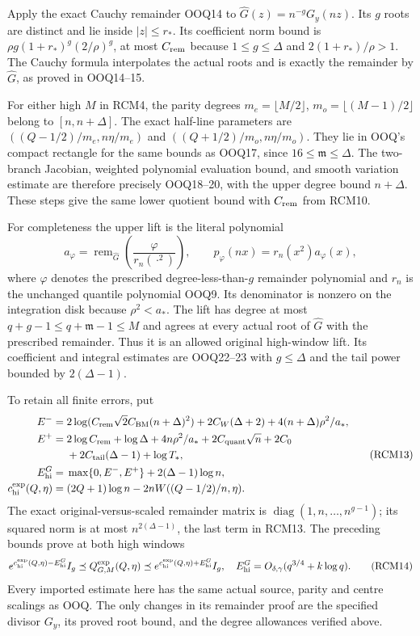 \documentclass[11pt,a4paper]{article}
\begin{document}
Apply the exact Cauchy remainder OOQ14 to
$\widehat G(z)=n^{-g}G_y(nz)$. Its $g$ roots are distinct
and lie inside $|z|\le r_*$. Its coefficient norm bound is
$\rho g(1+r_*)^g(2/\rho)^g$, at most $C_{\rm rem}$ because
$1\le g\le\Delta$ and $2(1+r_*)/\rho>1$. The Cauchy
formula interpolates the actual roots and is exactly the
remainder by $\widehat G$, as proved in OOQ14--15.

For either high $M$ in RCM4, the parity degrees
$m_e=\lfloor M/2\rfloor$, $m_o=\lfloor(M-1)/2\rfloor$
belong to $[n,n+\Delta]$. The exact half-line parameters are
$((Q-1/2)/m_e,n\eta/m_e)$ and
$((Q+1/2)/m_o,n\eta/m_o)$. They lie in OOQ's compact
rectangle for the same bounds as OOQ17, since
$16\le\mathfrak m\le\Delta$. The two-branch Jacobian,
weighted polynomial evaluation bound, and smooth variation
estimate are therefore precisely OOQ18--20, with the upper
degree bound $n+\Delta$. These steps give the same lower
quotient bound with $C_{\rm rem}$ from RCM10.

For completeness the upper lift is the literal polynomial
\[
 a_{\varphi}=\operatorname{rem}_{\widehat G}
                   \left(\frac{\varphi}{r_n(\cdot^2)}\right),
 \qquad p_{\varphi}(nx)=r_n(x^2)a_{\varphi}(x),
 \tag{RCM12}
\]
where $\varphi$ denotes the prescribed
degree-less-than-$g$ remainder polynomial and $r_n$ is the
unchanged quantile polynomial OOQ9. Its denominator is nonzero
on the integration disk because $\rho^2<a_*$. The lift has
degree at most $q+g-1\le q+\mathfrak m-1\le M$ and agrees
at every actual root of $\widehat G$ with the prescribed
remainder. Thus it is an allowed original high-window lift.
Its coefficient and integral estimates are OOQ22--23 with
$g\le\Delta$ and the tail power bounded by $2(\Delta-1)$.

To retain all finite errors, put
\[
 \begin{split}
 E^-={}&2\log(C_{\rm rem}\sqrt2 C_{\rm BM}(n+\Delta)^2)
           +2C_W(\Delta+2)+4(n+\Delta)\rho^2/a_*,\\
 E^+={}&2\log C_{\rm rem}+\log\Delta+4n\rho^2/a_*
       +2C_{\rm quant}\sqrt n+2C_0\\
       &{}+2C_{\rm tail}(\Delta-1)+\log T_*,\\
 E_{\rm hi}^G={}&\max\{0,E^-,E^+\}+2(\Delta-1)\log n,\\
 c_{\rm hi}^{\exp}(Q,\eta)
       ={}&(2Q+1)\log n-2nW((Q-1/2)/n,\eta).
 \end{split}\tag{RCM13}
\]
The exact original-versus-scaled remainder matrix is
$\operatorname{diag}(1,n,\ldots,n^{g-1})$; its squared
norm is at most $n^{2(\Delta-1)}$, the last term in RCM13.
The preceding bounds prove at both high windows
\[
 e^{c_{\rm hi}^{\exp}(Q,\eta)-E_{\rm hi}^G}I_g
 \preceq Q_{G,M}^{\exp}(Q,\eta)
 \preceq e^{c_{\rm hi}^{\exp}(Q,\eta)+E_{\rm hi}^G}I_g,
 \quad E_{\rm hi}^G=O_{\delta,\gamma}(q^{3/4}+k\log q).
 \tag{RCM14}
\]
Every imported estimate here has the same actual source,
parity and centre scalings as OOQ. The only changes in its
remainder proof are the specified divisor $G_y$, its proved
root bound, and the degree allowances verified above.
\end{document}
